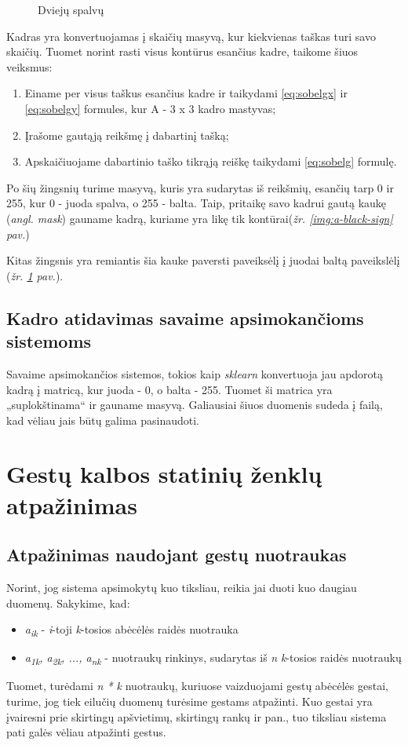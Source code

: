 \documentclass{VUMIFInfKursinis}
\begin{document}
\begin{figure}[H]
\begin{minipage}{.3\textwidth}
		\caption{Dviejų spalvų}
		\label{img:a-white-sign}
	\end{minipage}
\end{figure}
Kadras yra konvertuojamas į skaičių masyvą, kur kiekvienas taškas turi savo skaičių. Tuomet norint rasti visus kontūrus esančius kadre, taikome šiuos veiksmus:
\begin{enumerate}
	\item Einame per visus taškus esančius kadre ir taikydami \ref{eq:sobelgx} ir \ref{eq:sobelgy} formules, kur A - 3 x 3 kadro mastyvas;
	\item Įrašome gautąją reikšmę į dabartinį tašką;
	\item Apskaičiuojame dabartinio taško tikrąją reiškę taikydami \ref{eq:sobelg} formulę.
\end{enumerate}

Po šių žingsnių turime masyvą, kuris yra sudarytas iš reikšmių, esančių tarp 0 ir 255, kur 0 - juoda spalva, o 255 - balta. Taip, pritaikę savo kadrui gautą kaukę (\textit{angl. mask}) gauname kadrą, kuriame yra likę tik kontūrai(\textit{žr. \ref{img:a-black-sign} pav.})

Kitas žingsnis yra remiantis šia kauke paversti paveiksėlį į juodai baltą paveikslėlį (\textit{žr. \ref{img:a-white-sign} pav.}).

\subsection{Kadro atidavimas savaime apsimokančioms sistemoms}
Savaime apsimokančios sistemos, tokios kaip \textit{sklearn} konvertuoja jau apdorotą kadrą į matricą, kur juoda - 0, o balta - 255. Tuomet ši matrica yra „suplokštinama“ ir gauname masyvą. Galiausiai šiuos duomenis sudeda į failą, kad vėliau jais būtų galima pasinaudoti.


\section{Gestų kalbos statinių ženklų atpažinimas}
\subsection{Atpažinimas naudojant gestų nuotraukas}
Norint, jog sistema apsimokytų kuo tiksliau, reikia jai duoti kuo daugiau duomenų. Sakykime, kad:
\begin{itemize}
	\item\textit{a\textsubscript{ik}} - \textit{i}-toji \textit{k}-tosios abėcėlės raidės nuotrauka 
	\item\textit{a\textsubscript{1k}, a\textsubscript{2k}, ..., a\textsubscript{nk}} - nuotraukų rinkinys, sudarytas iš \textit{n} \textit{k}-tosios raidės nuotraukų
\end{itemize}
Tuomet, turėdami \textit{n * k} nuotraukų, kuriuose vaizduojami gestų abėcėlės gestai, turime, jog tiek eilučių duomenų turėsime gestams atpažinti. Kuo gestai yra įvairesni prie skirtingų apšvietimų, skirtingų rankų ir pan., tuo tiksliau sistema pati galės vėliau atpažinti gestus.
\end{document}
